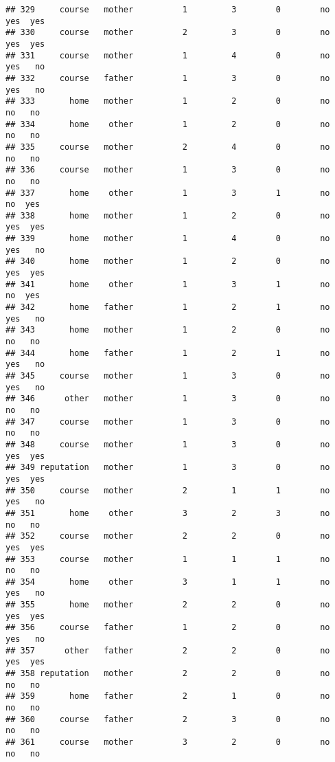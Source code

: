 \documentclass[
]{article}
\begin{document}
\begin{verbatim}
## 329     course   mother          1         3        0        no    yes  yes
## 330     course   mother          2         3        0        no    yes  yes
## 331     course   mother          1         4        0        no    yes   no
## 332     course   father          1         3        0        no    yes   no
## 333       home   mother          1         2        0        no     no   no
## 334       home    other          1         2        0        no     no   no
## 335     course   mother          2         4        0        no     no   no
## 336     course   mother          1         3        0        no     no   no
## 337       home    other          1         3        1        no     no  yes
## 338       home   mother          1         2        0        no    yes  yes
## 339       home   mother          1         4        0        no    yes   no
## 340       home   mother          1         2        0        no    yes  yes
## 341       home    other          1         3        1        no     no  yes
## 342       home   father          1         2        1        no    yes   no
## 343       home   mother          1         2        0        no     no   no
## 344       home   father          1         2        1        no    yes   no
## 345     course   mother          1         3        0        no    yes   no
## 346      other   mother          1         3        0        no     no   no
## 347     course   mother          1         3        0        no     no   no
## 348     course   mother          1         3        0        no    yes  yes
## 349 reputation   mother          1         3        0        no    yes  yes
## 350     course   mother          2         1        1        no    yes   no
## 351       home    other          3         2        3        no     no   no
## 352     course   mother          2         2        0        no    yes  yes
## 353     course   mother          1         1        1        no     no   no
## 354       home    other          3         1        1        no    yes   no
## 355       home   mother          2         2        0        no    yes  yes
## 356     course   father          1         2        0        no    yes   no
## 357      other   father          2         2        0        no    yes  yes
## 358 reputation   mother          2         2        0        no     no   no
## 359       home   father          2         1        0        no     no   no
## 360     course   father          2         3        0        no     no   no
## 361     course   mother          3         2        0        no     no   no

\end{verbatim}
\end{document}
